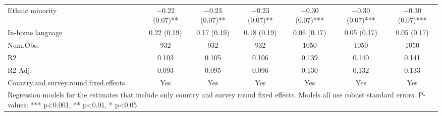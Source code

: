 \begin{table}
\begin{tabular}[t]{lcccccc}
Ethnic minority & \num{-0.22} (\num{0.07})** & \num{-0.23} (\num{0.07})** & \num{-0.23} (\num{0.07})** & \num{-0.30} (\num{0.07})*** & \num{-0.30} (\num{0.07})*** & \num{-0.30} (\num{0.07})***\\
In-home language & \num{0.22} (\num{0.19}) & \num{0.17} (\num{0.19}) & \num{0.18} (\num{0.19}) & \num{0.06} (\num{0.17}) & \num{0.05} (\num{0.17}) & \num{0.05} (\num{0.17})\\
\midrule
Num.Obs. & \num{932} & \num{932} & \num{932} & \num{1050} & \num{1050} & \num{1050}\\
R2 & \num{0.103} & \num{0.105} & \num{0.106} & \num{0.139} & \num{0.140} & \num{0.141}\\
R2 Adj. & \num{0.093} & \num{0.095} & \num{0.096} & \num{0.130} & \num{0.132} & \num{0.133}\\
Country.and.survey.round.fixed.effects & Yes & Yes & Yes & Yes & Yes & Yes\\
\bottomrule
\multicolumn{7}{l}{\rule{0pt}{1em}Regression models for the estimates that include only country and survey round fixed effects. Models all use robust standard errors. P-values: *** p<0.001, ** p<0.01, * p<0.05}\\
\end{tabular}
\end{table}
